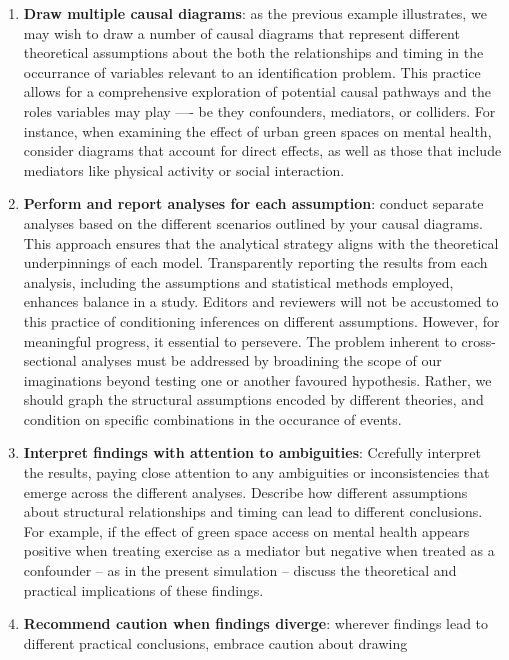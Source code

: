 \documentclass[
  singlecolumn]{article}
\begin{document}
\begin{enumerate}
\def\labelenumi{\arabic{enumi}.}
\item
  \textbf{Draw multiple causal diagrams}: as the previous example
  illustrates, we may wish to draw a number of causal diagrams that
  represent different theoretical assumptions about the both the
  relationships and timing in the occurrance of variables relevant to an
  identification problem. This practice allows for a comprehensive
  exploration of potential causal pathways and the roles variables may
  play ---- be they confounders, mediators, or colliders. For instance,
  when examining the effect of urban green spaces on mental health,
  consider diagrams that account for direct effects, as well as those
  that include mediators like physical activity or social interaction.
\item
  \textbf{Perform and report analyses for each assumption}: conduct
  separate analyses based on the different scenarios outlined by your
  causal diagrams. This approach ensures that the analytical strategy
  aligns with the theoretical underpinnings of each model. Transparently
  reporting the results from each analysis, including the assumptions
  and statistical methods employed, enhances balance in a study. Editors
  and reviewers will not be accustomed to this practice of conditioning
  inferences on different assumptions. However, for meaningful progress,
  it essential to persevere. The problem inherent to cross-sectional
  analyses must be addressed by broadining the scope of our imaginations
  beyond testing one or another favoured hypothesis. Rather, we should
  graph the structural assumptions encoded by different theories, and
  condition on specific combinations in the occurance of events.
\item
  \textbf{Interpret findings with attention to ambiguities}: Ccrefully
  interpret the results, paying close attention to any ambiguities or
  inconsistencies that emerge across the different analyses. Describe
  how different assumptions about structural relationships and timing
  can lead to different conclusions. For example, if the effect of green
  space access on mental health appears positive when treating exercise
  as a mediator but negative when treated as a confounder -- as in the
  present simulation -- discuss the theoretical and practical
  implications of these findings.
\item
  \textbf{Recommend caution when findings diverge}: wherever findings
  lead to different practical conclusions, embrace caution about drawing

\end{enumerate}
\end{document}
